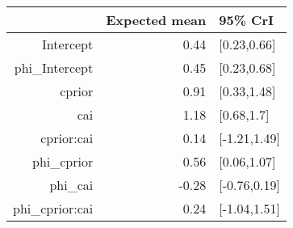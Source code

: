 \begin{tabular}{rrl}
  \hline
 & Expected mean & 95\% CrI \\ 
  \hline
Intercept & 0.44 & [0.23,0.66] \\ 
  phi\_Intercept & 0.45 & [0.23,0.68] \\ 
  cprior & 0.91 & [0.33,1.48] \\ 
  cai & 1.18 & [0.68,1.7] \\ 
  cprior:cai & 0.14 & [-1.21,1.49] \\ 
  phi\_cprior & 0.56 & [0.06,1.07] \\ 
  phi\_cai & -0.28 & [-0.76,0.19] \\ 
  phi\_cprior:cai & 0.24 & [-1.04,1.51] \\ 
   \hline
\end{tabular}

